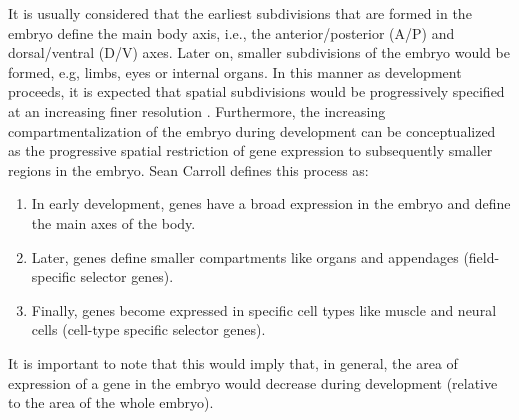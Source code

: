 It is usually considered that the earliest subdivisions that are formed in the embryo define the main body axis, i.e., the anterior/posterior (A/P) and dorsal/ventral (D/V) axes.
Later on, smaller subdivisions of the embryo would be formed, e.g, limbs, eyes or internal organs. In this manner as development proceeds, it is expected that spatial subdivisions would be progressively specified at an increasing finer resolution \citep{Davidson2001}.
Furthermore, the increasing compartmentalization of the embryo during development can be conceptualized as the progressive spatial restriction of gene expression to subsequently smaller regions in the embryo.
Sean Carroll defines this process\citep{Carroll2001} as:
\begin{enumerate}
\item In early development, genes have a broad expression in the embryo and define the main axes of the body.
\item Later, genes define smaller compartments like organs and appendages (field-specific selector genes).
\item Finally, genes become expressed in specific cell types like muscle and neural cells (cell-type specific selector genes). 
\end{enumerate}
It is important to note that this would imply that, in general, the area of expression of a gene in the embryo would decrease during development (relative to the area of the whole embryo).

